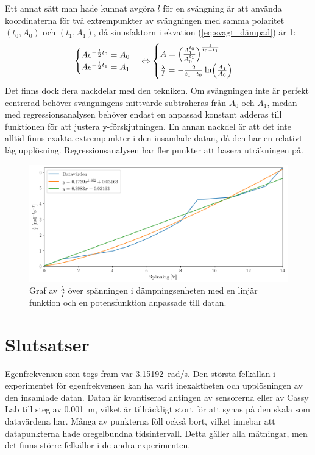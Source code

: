 \documentclass[12pt, a4paper]{article}
\begin{document}
Ett annat sätt man hade kunnat avgöra $l$ för en svängning är att använda koordinaterna för två extrempunkter av svängningen med samma polaritet $(t_0,A_0)$ och $(t_1,A_1)$, då sinusfaktorn i ekvation (\ref{eq:svagt_dämpad}) är 1:
\begin{equation*}
	\begin{cases}
		Ae^{-\frac{l}{2}t_0}=A_0\\
		Ae^{-\frac{l}{2}t_1}=A_1
	\end{cases}
	\Leftrightarrow
	\begin{cases}
		A=\Bigl(\frac{A_1^{t_0}}{A_0^{t_1}}\Bigr)^\frac{1}{t_0-t_1}\\
		\frac{\lambda}{I}=-\frac{2}{t_1-t_0}\ln\Bigl(\frac{A_1}{A_0}\Bigr)
	\end{cases}
\end{equation*}
Det finns dock flera nackdelar med den tekniken. Om svängningen inte är perfekt centrerad behöver svängningens mittvärde subtraheras från $A_0$ och $A_1$, medan med regressionsanalysen behöver endast en anpassad konstant adderas till funktionen för att justera y-förskjutningen. En annan nackdel är att det inte alltid finns exakta extrempunkter i den insamlade datan, då den har en relativt låg upplösning. Regressionsanalysen har fler punkter att basera uträkningen på. 

\begin{figure}[hp]
	\includegraphics[width=\textwidth]{graf_voltage_damping}
	\caption{Graf av $\frac{\lambda}{I}$ över spänningen i dämpningsenheten med en linjär funktion och en potensfunktion anpassade till datan.}
	\label{fig:dämpning_över_spänning}
\end{figure}

\section{Slutsatser}
Egenfrekvensen som togs fram var \SI{3.15192}{rad/s}. Den största felkällan i experimentet för egenfrekvensen kan ha varit inexaktheten och upplösningen av den insamlade datan. Datan är kvantiserad antingen av sensorerna eller av Cassy Lab till steg av \SI{0.001}{m}, vilket är tillräckligt stort för att synas på den skala som datavärdena har. Många av punkterna föll också bort, vilket innebar att datapunkterna hade oregelbundna tidsintervall. Detta gäller alla mätningar, men det finns större felkällor i de andra experimenten.
\end{document}
